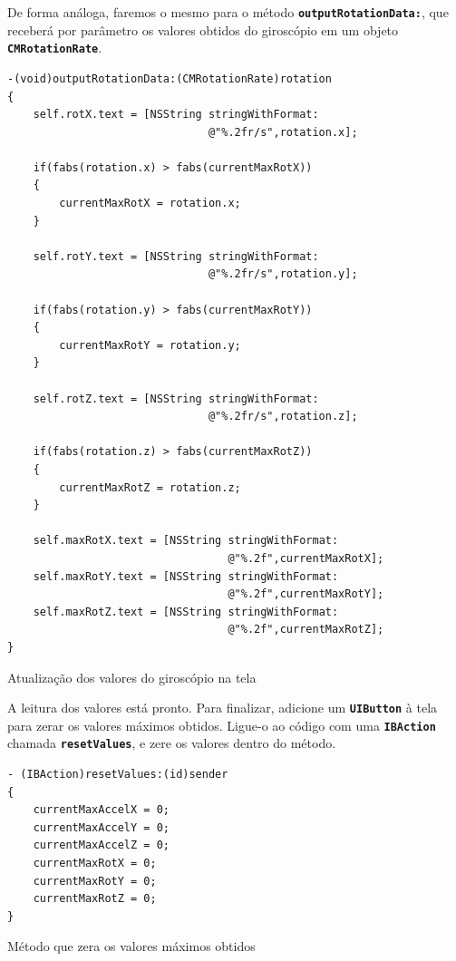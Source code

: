 \documentclass[a4paper,12pt,brazil,oneside]{book}
\begin{document}
De forma análoga, faremos o mesmo para o método \texttt{\textbf{outputRotationData:}}, que receberá por parâmetro os valores obtidos do giroscópio em um objeto \texttt{\textbf{CMRotationRate}}.

\begin{listing}[H]
\begin{verbatim}
-(void)outputRotationData:(CMRotationRate)rotation
{
    self.rotX.text = [NSString stringWithFormat:
                               @"%.2fr/s",rotation.x];
    
    if(fabs(rotation.x) > fabs(currentMaxRotX))
    {
        currentMaxRotX = rotation.x;
    }
    
    self.rotY.text = [NSString stringWithFormat:
                               @"%.2fr/s",rotation.y];
    
    if(fabs(rotation.y) > fabs(currentMaxRotY))
    {
        currentMaxRotY = rotation.y;
    }
    
    self.rotZ.text = [NSString stringWithFormat:
                               @"%.2fr/s",rotation.z];
    
    if(fabs(rotation.z) > fabs(currentMaxRotZ))
    {
        currentMaxRotZ = rotation.z;
    }
    
    self.maxRotX.text = [NSString stringWithFormat:
                                  @"%.2f",currentMaxRotX];
    self.maxRotY.text = [NSString stringWithFormat:
                                  @"%.2f",currentMaxRotY];
    self.maxRotZ.text = [NSString stringWithFormat:
                                  @"%.2f",currentMaxRotZ];
}
\end{verbatim}
\caption{Atualização dos valores do giroscópio na tela}
\end{listing}


A leitura dos valores está pronto. Para finalizar, adicione um \texttt{\textbf{UIButton}} à tela para zerar os valores máximos obtidos. Ligue-o ao código com uma \texttt{\textbf{IBAction}} chamada \texttt{\textbf{resetValues}}, e zere os valores dentro do método.

\begin{listing}[H]
\begin{verbatim}
- (IBAction)resetValues:(id)sender
{
    currentMaxAccelX = 0;
    currentMaxAccelY = 0;
    currentMaxAccelZ = 0;
    currentMaxRotX = 0;
    currentMaxRotY = 0;
    currentMaxRotZ = 0;
}
\end{verbatim}
\caption{Método que zera os valores máximos obtidos}
\end{listing}
\end{document}
